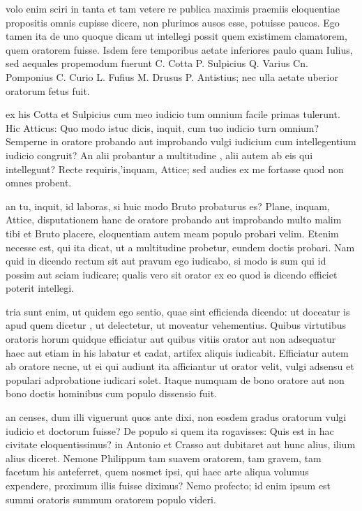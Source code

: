  volo enim sciri in tanta et tam vetere re publica maximis praemiis eloquentiae propositis omnis cupisse dicere, non plurimos ausos esse, potuisse paucos. Ego tamen ita de uno quoque dicam ut intellegi possit quem existimem clamatorem, quem oratorem fuisse. Isdem fere temporibus aetate inferiores paulo quam Iulius, sed aequales propemodum fuerunt C. Cotta P. Sulpicius Q. Varius Cn. Pomponius C. Curio L. Fufius M. Drusus P. Antistius; nec ulla aetate uberior oratorum fetus fuit.

 ex his Cotta et Sulpicius cum meo iudicio tum omnium facile primas tulerunt. Hic Atticus: Quo modo istuc dicis, inquit, cum tuo iudicio turn omnium? Semperne in oratore probando aut improbando vulgi iudicium cum intellegentium iudicio congruit? An alii probantur a multitudine , alii autem ab eis qui intellegunt? Recte requiris,'inquam, Attice; sed audies ex me fortasse quod non omnes probent.

 an tu, inquit, id laboras, si huic modo Bruto probaturus es? Plane, inquam, Attice, disputationem hanc de oratore probando aut improbando multo malim tibi et Bruto placere, eloquentiam autem meam populo probari velim. Etenim necesse est, qui ita dicat, ut a multitudine probetur, eundem doctis probari. Nam quid in dicendo rectum sit aut pravum ego iudicabo, si modo is sum qui id possim aut sciam iudicare; qualis vero sit orator ex eo quod is dicendo efficiet poterit intellegi.

 tria sunt enim, ut quidem ego sentio, quae sint efficienda dicendo: ut doceatur is apud quem dicetur , ut delectetur, ut moveatur vehementius. Quibus virtutibus oratoris horum quidque efficiatur aut quibus vitiis orator aut non adsequatur haec aut etiam in his labatur et cadat, artifex aliquis iudicabit. Efficiatur autem ab oratore necne, ut ei qui audiunt ita afficiantur ut orator velit, vulgi adsensu et populari adprobatione iudicari solet. Itaque numquam de bono oratore aut non bono doctis hominibus cum populo dissensio fuit.

 an censes, dum illi viguerunt quos ante dixi, non eosdem gradus oratorum vulgi iudicio et doctorum fuisse? De populo si quem ita rogavisses: Quis est in hac civitate eloquentissimus? in Antonio et Crasso aut dubitaret aut hunc alius, ilium alius diceret. Nemone Philippum tam suavem oratorem, tam gravem, tam facetum his anteferret, quem nosmet ipsi, qui haec arte aliqua volumus expendere, proximum illis fuisse diximus? Nemo profecto; id enim ipsum est summi oratoris summum oratorem populo videri.

